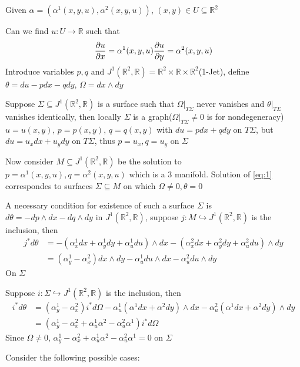 \documentclass[../main.tex]{subfiles}
\begin{document}
\begin{example}
Given $\alpha=(\alpha^1(x,y,u),\alpha^2(x,y,u))$, $(x,y)\in U\subseteq\mathbb R^2$ \par
Can we find $u:U\to\mathbb R$ such that
\begin{equation}\label{eq:1}
\dfrac{\partial u}{\partial x}=\alpha^1(x,y,u) \\
\dfrac{\partial u}{\partial y}=\alpha^2(x,y,u)
\end{equation}
Introduce variables $p,q$ and $J^1(\mathbb R^2,\mathbb R)=\mathbb R^2\times\mathbb R\times\mathbb R^2$(1-Jet), define $\theta=du-pdx-qdy$, $\Omega=dx\wedge dy$ \par
Suppose $\Sigma\subseteq J^1(\mathbb R^2,\mathbb R)$ is a surface such that $\Omega|_{T\Sigma}$ never vanishes and $\theta|_{T\Sigma}$ vanishes identically, then locally $\Sigma$ is a graph($\Omega|_{T\Sigma}\neq0$ is for nondegeneracy) $u=u(x,y)$, $p=p(x,y)$, $q=q(x,y)$ with $du=pdx+qdy$ on $T\Sigma$, but $du=u_xdx+u_ydy$ on $T\Sigma$, thus $p=u_x,q=u_y$ on $\Sigma$ \par
Now consider $M\subseteq J^1(\mathbb R^2,\mathbb R)$ be the solution to $p=\alpha^1(x,y,u),q=\alpha^2(x,y,u)$ which is a $3$ manifold. Solution of \eqref{eq:1} correspondes to surfaces $\Sigma\subseteq M$ on which $\Omega\neq0, \theta=0$ \par
A necessary condition for existence of such a surface $\Sigma$ is $d\theta=-dp\wedge dx-dq\wedge dy$ in $J^1(\mathbb R^2,\mathbb R)$, suppose $j:M\hookrightarrow J^1(\mathbb R^2,\mathbb R)$ is the inclusion, then
\begin{align*}
j^*d\theta&=-(\alpha^1_xdx+\alpha^1_ydy+\alpha^1_udu)\wedge dx-(\alpha^2_xdx+\alpha^2_ydy+\alpha^2_udu)\wedge dy \\
&=(\alpha^1_y-\alpha^2_x)dx\wedge dy-\alpha^1_udu\wedge dx-\alpha^2_udu\wedge dy
\end{align*}
On $\Sigma$ \par
Suppose $i:\Sigma\hookrightarrow J^1(\mathbb R^2,\mathbb R)$ is the inclusion, then
\begin{align*}
i^*d\theta&=(\alpha^1_y-\alpha^2_x)i^*d\Omega-\alpha^1_u(\alpha^1dx+\alpha^2dy)\wedge dx-\alpha^2_u(\alpha^1dx+\alpha^2dy)\wedge dy \\
&=(\alpha^1_y-\alpha^2_x+\alpha^1_u\alpha^2-\alpha^2_u\alpha^1)i^*d\Omega
\end{align*}
Since $\Omega\neq0$, $\alpha^1_y-\alpha^2_x+\alpha^1_u\alpha^2-\alpha^2_u\alpha^1=0$ on $\Sigma$ \par
Consider the following possible cases: \par

\end{example}
\end{document}
